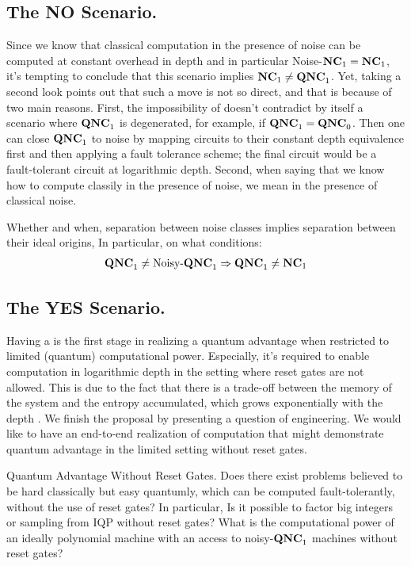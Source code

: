 \documentclass[manuscript,screen,review]{acmart}
\begin{document}
{  \subsection{The NO Scenario.} 
  Since we know that classical computation in the presence of noise can be computed at constant overhead in depth and in particular Noise-$\mathbf{NC}_{1} = \mathbf{NC}_{1}$, it's tempting to conclude that this scenario implies $\mathbf{NC}_{1} \neq \mathbf{QNC}_{1}$. Yet, taking a second look points out that such a move is not so direct, and that is because of two main reasons. First, the impossibility of \CDO{} doesn't contradict by itself a scenario where $\mathbf{QNC}_{1}$ is degenerated, for example, if $\mathbf{QNC}_{1} = \mathbf{QNC}_{0}$. Then one can close $\mathbf{QNC}_{1}$ to noise by mapping circuits to their constant depth equivalence first and then applying a fault tolerance scheme; the final circuit would be a fault-tolerant circuit at logarithmic depth. 
  Second, when saying that we know how to compute classily in the presence of noise, we mean in the presence of classical noise.  

  \begin{oproblem}
    Whether and when, separation between noise classes implies separation between their ideal origins, In particular, on what conditions: 
    \begin{equation*}
      \begin{split}
        \mathbf{QNC}_{1} \neq \text{Noisy-}\mathbf{QNC}_{1} \Rightarrow \mathbf{QNC}_{1} \neq \mathbf{NC}_{1}
      \end{split}
    \end{equation*}
  \end{oproblem}

  \subsection{The YES Scenario.} 
Having a \CDO{} is the first stage in realizing a quantum advantage when restricted to limited (quantum) computational power. Especially, it's required to enable computation in logarithmic depth in the setting where reset gates are not allowed. This is due to the fact that there is a trade-off between the memory of the system and the entropy accumulated, which grows exponentially with the depth \cite{aharonov1999faulttolerant}. We finish the proposal by presenting a question of engineering. We would like to have an end-to-end realization of computation that might demonstrate quantum advantage in the limited setting without reset gates.

  \begin{oproblem}{Quantum Advantage Without Reset Gates.}
    Does there exist problems believed to be hard classically but easy quantumly, which can be computed fault-tolerantly, without the use of reset gates? In particular, Is it possible to factor big integers or sampling from IQP  without reset gates? What is the computational power of an ideally polynomial machine with an access to noisy-$\mathbf{QNC}_{1}$ machines without reset gates? 
  \end{oproblem}





}
\end{document}
